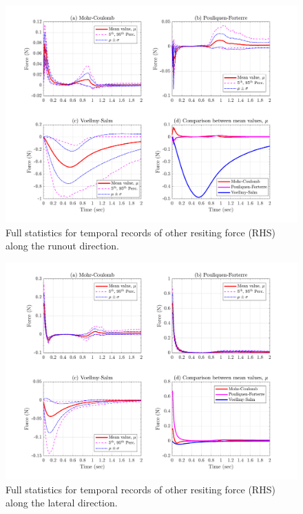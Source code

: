 \documentclass{article}
\begin{document}
\begin{figure}[H]
        \centering
        \includegraphics[width=1\textwidth]{InclinedPlane/GlobalRecords/Fresx.png}
        \caption{Full statistics for temporal records of other resiting force (RHS) along the runout direction.}
        \label{fig:Ramp-Fresx}
\end{figure}

\begin{figure}[H]
        \centering
        \includegraphics[width=1\textwidth]{InclinedPlane/GlobalRecords/Fresy.png}
        \caption{Full statistics for temporal records of other resiting force (RHS) along the lateral direction.}
        \label{fig:Ramp-Fresy}
\end{figure}
\end{document}
